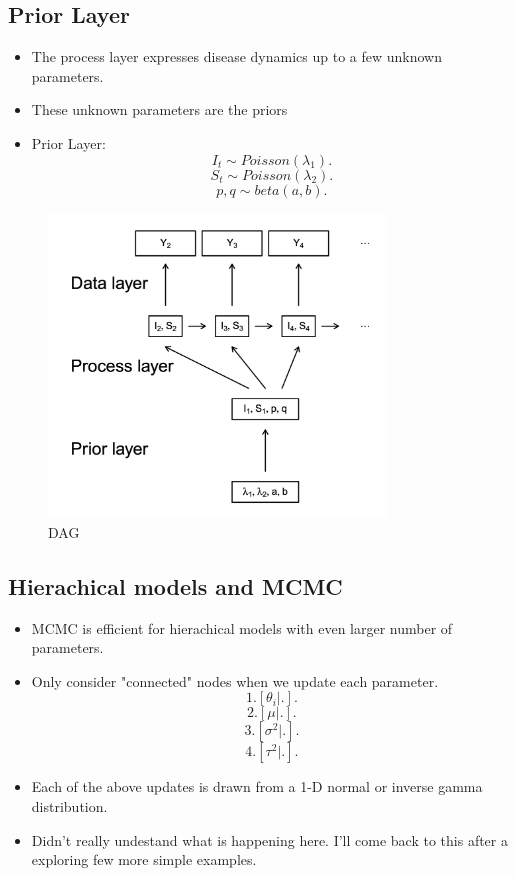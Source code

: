 \documentclass{article}
\begin{document}
\begin{itemize}
        \subsection{Prior Layer}
        \begin{itemize}
            \item The process layer expresses disease dynamics up to a few unknown parameters.
            \item These unknown parameters are the priors
            \item Prior Layer:
                \[
                    I_{t} \sim  Poisson(\lambda_{1})
                .\] 
                \[
                    S_{t} \sim Poisson(\lambda_{2})
                .\] 
                \[
                    p, q \sim beta(a,b) 
                .\] 
        \end{itemize}
        \begin{figure}[H]
            \centering
            \includegraphics[width=0.8\textwidth]{dag}
            \caption{DAG}
            \label{fig:dag}
        \end{figure}
        \subsection{Hierachical models and MCMC}
        \begin{itemize}
            \item MCMC is efficient for hierachical models with even larger number of parameters.
            \item Only consider "connected" nodes when we update each parameter.
                \[
                    1. [\theta_{i}|.]
                .\]
                \[
                    2. [\mu|.]
                .\] 
                \[
                    3. [\sigma^2|.]
                .\] 
                \[
                    4. [\tau^2|.]
                .\] 
            \item Each of the above updates is drawn from a 1-D normal or inverse gamma distribution. 
            \item Didn't really undestand what is happening here. I'll come back to this after a exploring few more simple examples.
        \end{itemize}
\end{itemize}
\end{document}
